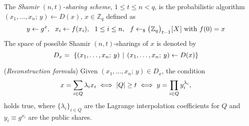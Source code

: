 \documentclass{iacrtrans}
\begin{document}
\begin{defn}\label{shamir_definition}
The \textit{Shamir $(n, t)$-sharing scheme}, $1 \le t \le n < q$,
is the probabilistic algorithm
$(x_1, \dots, x_n;\hspace{2pt} y) \leftarrow D(x),
\hspace{2pt} x \in \mathbb{Z}_q$
defined as
\vspace{5pt}
\begin{equation*}
y \leftarrow g ^ x,
\ \ x_i \leftarrow f(x_i),
\ \ 1 \le i \le n,
\ \ f \leftarrow_\$ \big(
	\hspace{0.3pt}
	\mathbb{Z}_q
	\hspace{0.3pt}
	\big)_{t-1}
	\hspace{0.3pt}
	[
		\hspace{0.5pt}
		X
		\hspace{0.5pt}
	]
\textup{ with }
f(0) = x
\hspace{0pt}
\vspace{5pt}
\end{equation*}
The space of possible Shamir $(n,t)$-sharings of $x$
is denoted by
\vspace{5pt}
\begin{equation*}
D_x =\
\left\{(x_1, \dots, x_n;\hspace{2pt} y)
\hspace{4pt}
\middle\vert
\hspace{4pt}
(x_1, \dots, x_n;\hspace{2pt} y) \leftarrow D(x)
\right\}
\hspace{0pt}
\vspace{5pt}
\end{equation*}
\end{defn}

\begin{rem}\label{shamir_reconstruction}
(\textit{Reconstruction formula})
Given $(x_1, \dots, x_n;\hspace{2pt} y) \in D_x$,
the condition
\vspace{5pt}
\begin{equation}\label{shamir_threshold_condition}
x = \sum_{i \in Q} \lambda_i x_i
\iff
|Q| \ge t
\iff
y = \prod_{i \in Q} y_i^{\lambda_i},
\vspace{5pt}
\end{equation}
holds true,
where $\{\lambda_i\}_{i \in Q}$ are the
Lagrange interpolation coefficients for $Q$
and $y_i\equiv g ^ {x_i}$
are the public shares.
\end{rem}
\end{document}
